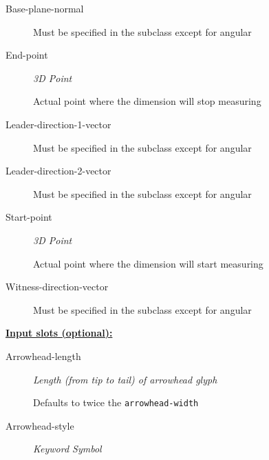\documentclass [11pt]{book}
\begin{document}
\begin{itemize}
\begin{description}
\item [Base-plane-normal]

Must be specified in the subclass except for angular




\item [End-point]
\emph{3D Point}

 Actual point where the dimension will stop measuring




\item [Leader-direction-1-vector]

Must be specified in the subclass except for angular




\item [Leader-direction-2-vector]

Must be specified in the subclass except for angular




\item [Start-point]
\emph{3D Point}

 Actual point where the dimension will start measuring




\item [Witness-direction-vector]

Must be specified in the subclass except for angular




\end{description}






\textbf{
\underline{Input slots (optional):}}

\begin{description}

\item [Arrowhead-length]
\emph{Length (from tip to tail) of arrowhead glyph}

 Defaults to twice the \texttt{arrowhead-width}




\item [Arrowhead-style]
\emph{Keyword Symbol}


\end{description}
\end{itemize}
\end{document}
